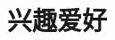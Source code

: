 \documentclass[11pt,a4paper,sans]{moderncv}   %
\makeatletter
\renewcommand*{\bibliographyitemlabel}{\@biblabel{\arabic{enumiv}}}
\makeatother
\begin{document}
\section{兴趣爱好}
\renewcommand{\listitemsymbol}{-~}            %



\nocite{*}



\clearpage
\end{document}
